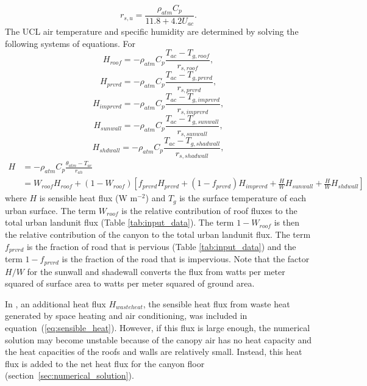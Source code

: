 \documentclass[12pt,authoryear]{elsarticle}
\numberwithin{equation}{section} %
\begin{document}
\begin{equation}
r_{s,u}=\frac{\rho_{atm}C_{p}}{11.8+4.2U_{ac}}.
\end{equation}
The UCL air temperature and specific humidity are determined by solving the
following systems of equations. For
\begin{equation}
\label{eq:sensible_heat_roof}
H_{roof}=-\rho_{atm}C_{p}\frac{T_{ac}-T_{g,roof}}{r_{s,roof}},
\end{equation}
\begin{equation}
H_{prvrd}=-\rho_{atm}C_{p}\frac{T_{ac}-T_{g,prvrd}}{r_{s,prvrd}},
\end{equation}
\begin{equation}
H_{imprvrd}=-\rho_{atm}C_{p}\frac{T_{ac}-T_{g,imprvrd}}{r_{s,imprvrd}},
\end{equation}
\begin{equation}
H_{sunwall}=-\rho_{atm}C_{p}\frac{T_{ac}-T_{g,sunwall}}{r_{s,sunwall}},
\end{equation}
\begin{equation}
\label{eq:sensible_heat_shdwall}
H_{shdwall}=-\rho_{atm}C_{p}\frac{T_{ac}-T_{g,shadwall}}{r_{s,shadwall}},
\end{equation}
\begin{equation}
\label{eq:sensible_heat}
\begin{aligned}
H&=-\rho_{atm}C_{p}\frac{\theta_{atm}-T_{ac}}{r_{ah}}\\
&=W_{roof}H_{roof}+(1-W_{roof})\left[f_{prvrd}H_{prvrd}+(1-f_{prvrd})H_{imprvrd}+\frac{H}{W}H_{sunwall}+\frac{H}{W}H_{shdwall}\right]
\end{aligned}
\end{equation}
where $H$ is sensible heat flux (W m$^{-2}$) and $T_{g}$ is the surface temperature of each urban surface. The term $W_{roof}$ is the relative contribution of roof fluxes to the total urban landunit flux (Table \ref{tab:input_data}). The term $1-W_{roof}$ is then the relative contribution of the canyon to the total urban landunit flux. The term $f_{prvrd}$ is the fraction of road that is pervious (Table \ref{tab:input_data}) and the term $1-f_{prvrd}$ is the fraction of the road that is impervious. Note that the factor $H/W$ for the sunwall and shadewall converts the flux from watts per meter squared of surface area to watts per meter squared of ground area.

In \cite{OLESONETAL08J.Appl.Meteorol.Climatol.a}, an additional heat flux $H_{wasteheat}$, the sensible heat flux from waste heat generated by space heating and air conditioning, was included in equation~(\ref{eq:sensible_heat}). However, if this flux is large enough, the numerical solution may become unstable because of the canopy air has no heat capacity and the heat capacities of the roofs and walls are relatively small. Instead, this heat flux is added to the net heat flux for the canyon floor (section~\ref{sec:numerical_solution}).
\end{document}

